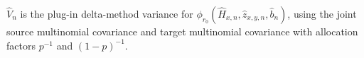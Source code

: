 \(\widehat V_n\) is the plug-in delta-method variance for \(\phi_{r_0}(\widehat H_{x,n},\widehat z_{x,y,n},\widehat b_n)\), using the joint source multinomial covariance and target multinomial covariance with allocation factors \(p^{-1}\) and \((1-p)^{-1}\).